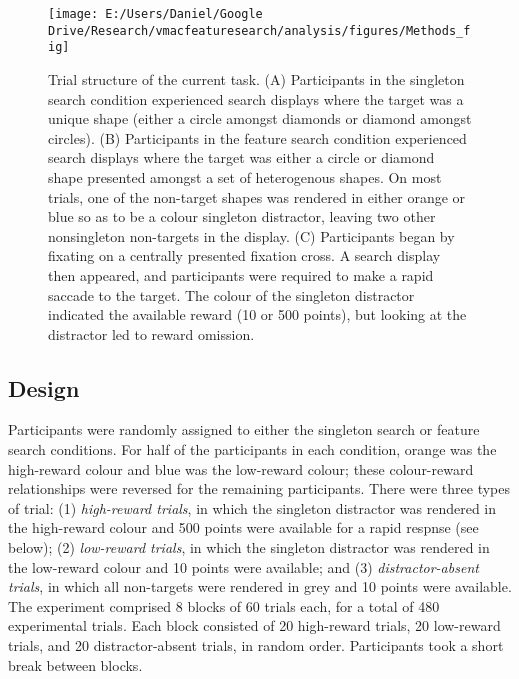 \documentclass[man, a4paper, noextraspace, 11pt,floatsintext]{apa6}
\begin{document}
\begin{figure}[!h]

{\centering \texttt{[image: E:/Users/Daniel/Google Drive/Research/vmacfeaturesearch/analysis/figures/Methods\_fig]} 

}

\caption{Trial structure of the current task. (A) Participants in
the singleton search condition experienced search displays where the
target was a unique shape (either a circle amongst diamonds or diamond
amongst circles). (B) Participants in the feature search condition
experienced search displays where the target was either a circle or
diamond shape presented amongst a set of heterogenous shapes. On most
trials, one of the non-target shapes was rendered in either orange or
blue so as to be a colour singleton distractor, leaving two other
nonsingleton non-targets in the display. (C) Participants began by
fixating on a centrally presented fixation cross. A search display then
appeared, and participants were required to make a rapid saccade to the
target. The colour of the singleton distractor indicated the available
reward (10 or 500 points), but looking at the distractor led to reward
omission.}\label{fig:methodFig}
\end{figure}

\subsection{Design}\label{design}

Participants were randomly assigned to either the singleton search or
feature search conditions. For half of the participants in each
condition, orange was the high-reward colour and blue was the low-reward
colour; these colour-reward relationships were reversed for the
remaining participants. There were three types of trial: (1)
\emph{high-reward trials}, in which the singleton distractor was
rendered in the high-reward colour and 500 points were available for a
rapid respnse (see below); (2) \emph{low-reward trials}, in which the
singleton distractor was rendered in the low-reward colour and 10 points
were available; and (3) \emph{distractor-absent trials}, in which all
non-targets were rendered in grey and 10 points were available. The
experiment comprised 8 blocks of 60 trials each, for a total of 480
experimental trials. Each block consisted of 20 high-reward trials, 20
low-reward trials, and 20 distractor-absent trials, in random order.
Participants took a short break between blocks.
\end{document}
